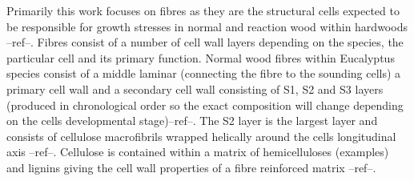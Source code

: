Primarily this work focuses on fibres as they are the structural cells expected
to be responsible for growth stresses in normal and reaction wood within
hardwoods --ref--. Fibres consist of a number of cell wall layers depending on
the species, the particular cell and its primary function. Normal wood fibres
within Eucalyptus species consist of a middle laminar (connecting the fibre to
the sounding cells) a primary cell wall and a secondary cell wall consisting of
S1, S2 and S3 layers (produced in chronological order so the exact composition
will change depending on the cells developmental stage)--ref--. The S2 layer is
the largest layer and consists of cellulose macrofibrils wrapped helically
around the cells longitudinal axis --ref--. Cellulose is contained within a
matrix of hemicelluloses (examples) and lignins giving the cell wall properties
of a fibre reinforced matrix --ref--.
